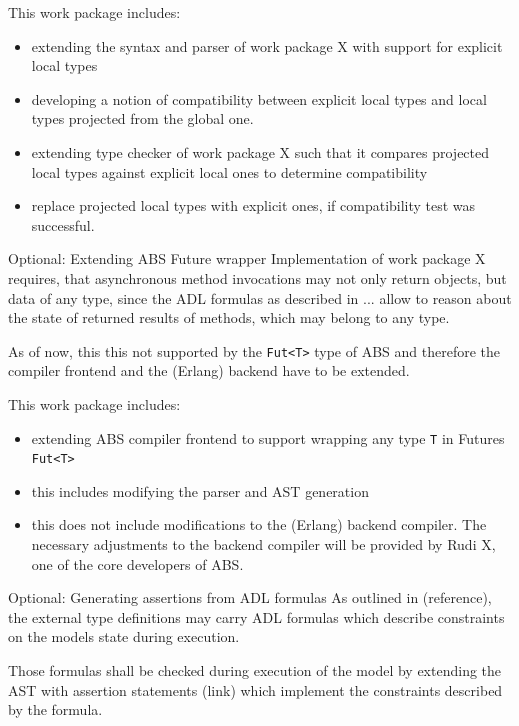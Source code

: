 \documentclass[paper=a4,nochapname,accentcolor=tud9c]{tudexercise}
\makeatletter
\def\namedlabel#1#2{\begingroup
    #1%
    \def\@currentlabel{\thedescriptcount}%
    \phantomsection\label{#2}\endgroup
}
\newcounter{descriptcount}
\renewcommand*\thedescriptcount{[\Alph{descriptcount}]}}
\renewcommand*\thedescriptcount{\roman{descriptcount}}}
\makeatother
\begin{document}
\begin{enumdescript}
    This work package includes:
    \begin{itemize}
      \item extending the syntax and parser of work package X with support for
        explicit local types
      \item developing a notion of compatibility between explicit local types
        and local types projected from the global one.
      \item extending type checker of work package X such that it compares
        projected local types against explicit local ones to determine
        compatibility
      \item replace projected local types with explicit ones, if compatibility
        test was successful.
    \end{itemize}
  \item[\namedlabel{Optional: Extending ABS Future wrapper}{WPAnyFut}]%
    Implementation of work package X requires, that asynchronous method
    invocations may not only return objects, but data of any type, since the ADL
    formulas as described in ... allow to reason about the state of returned
    results of methods, which may belong to any type.

    As of now, this this not supported by the \texttt{Fut<T>} type of ABS and
    therefore the compiler frontend and the (Erlang) backend have to be extended.

    This work package includes:
    \begin{itemize}
      \item extending ABS compiler frontend to support wrapping any type
        \texttt{T} in Futures \texttt{Fut<T>}
      \item this includes modifying the parser and AST generation
        \item this does not include modifications to the (Erlang) backend
          compiler. The necessary adjustments to the backend compiler will be
          provided by Rudi X, one of the core developers of ABS.
    \end{itemize}
  \item[\namedlabel{Optional: Generating assertions from ADL formulas}{WPAssertions}]%
    As outlined in (reference), the external type definitions may carry ADL
    formulas which describe constraints on the models state during execution.

    Those formulas shall be checked during execution of the model by extending
    the AST with assertion statements (link) which implement the constraints
    described by the formula.


\end{enumdescript}
\end{document}
